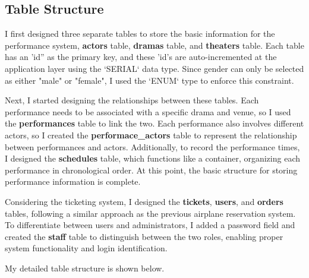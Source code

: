 \documentclass[12pt]{article}
\begin{document}
\subsection{Table Structure}
I first designed three separate tables to store the basic information for the performance system, \textbf{actors} table, \textbf{dramas} table, and \textbf{theaters} table. Each table has an 'id'' as the primary key, and these 'id's are auto-incremented at the application layer using the `SERIAL` data type. Since gender can only be selected as either "male" or "female", I used the `ENUM` type to enforce this constraint.
\par Next, I started designing the relationships between these tables. 
Each performance needs to be associated with a specific drama and venue, so I used the \textbf{performances} table to link the two. 
Each performance also involves different actors, so I created the \textbf{performace\_actors} table to represent the relationship between performances and actors. 
Additionally, to record the performance times, I designed the \textbf{schedules} table, which functions like a container, organizing each performance in chronological order. 
At this point, the basic structure for storing performance information is complete.
\par Considering the ticketing system, I designed the \textbf{tickets}, \textbf{users}, and \textbf{orders} tables, following a similar approach as the previous airplane reservation system.
To differentiate between users and administrators, I added a password field and created the \textbf{staff} table to distinguish between the two roles, enabling proper system functionality and login identification.
\par My detailed table structure is shown below.
\newpage
\end{document}
